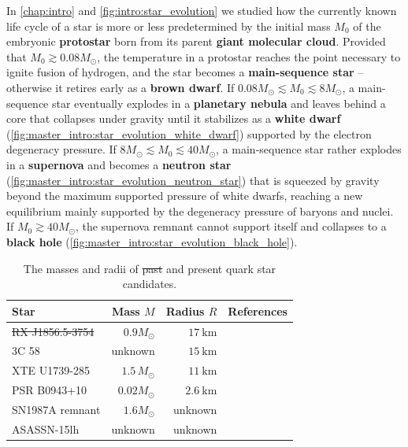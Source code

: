 In \cref{chap:intro} and \cref{fig:intro:star_evolution} we studied how the currently known life cycle of a star
is more or less predetermined by the initial mass $M_0$ of the embryonic \textbf{protostar} born from its parent \textbf{giant molecular cloud}.
Provided that $M_0 \gtrsim 0.08 M_\odot$, the temperature in a protostar reaches the point necessary to ignite fusion of hydrogen, and the star becomes a \textbf{main-sequence star} -- otherwise it retires early as a \textbf{brown dwarf}.
If $0.08 M_\odot \lesssim M_0 \lesssim 8 M_\odot$, a main-sequence star eventually explodes in a \textbf{planetary nebula} and leaves behind a core that collapses under gravity until it stabilizes as a \textbf{white dwarf} (\cref{fig:master_intro:star_evolution_white_dwarf}) supported by the electron degeneracy pressure.
If $8 M_\odot \lesssim M_0 \lesssim 40 M_\odot$, a main-sequence star rather explodes in a \textbf{supernova} and becomes a \textbf{neutron star} (\cref{fig:master_intro:star_evolution_neutron_star}) that is squeezed by gravity beyond the maximum supported pressure of white dwarfs, reaching a new equilibrium mainly supported by the degeneracy pressure of baryons and nuclei.
If $M_0 \gtrsim 40 M_\odot$, the supernova remnant cannot support itself and collapses to a \textbf{black hole} (\cref{fig:master_intro:star_evolution_black_hole}).

\begin{table}
\centering
\caption{\label{tab:master_intro:quark_star_candidates}%
The masses and radii of \st{past} and present quark star candidates.
}
\begin{tabular}{ l r r l }
	\toprule
	Star & Mass $M$ & Radius $R$ & References \\
	\midrule
	\st{RX J1856.5-3754} & \st{$0.9 M_\odot$} & \st{$\SI{17}{\kilo\meter}$} & \cite{ref:RXJ1856} \\
	3C 58 & unknown & $\SI{15}{\kilo\meter}$ & \cite{ref:3c58} \\
	XTE U1739-285 & $1.5 \, M_\odot$ & $\SI{11}{\kilo\meter}$ & \cite{ref:XTEJ1739} \\
	PSR B0943+10 & $0.02 M_\odot$ & $\SI{2.6}{\kilo\meter}$ & \cite{ref:PSRB0943} \\
	SN1987A remnant & $1.6 M_\odot$ & unknown & \cite{ref:SN1987A_1,ref:SN1987A_2} \\
	ASASSN-15lh & unknown & unknown & \cite{ref:ASASSN} \\
	\bottomrule
\end{tabular}
\end{table}

